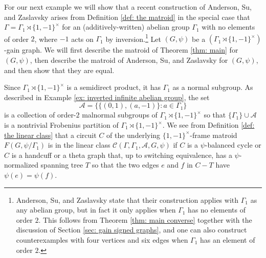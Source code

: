 \documentclass[12pt]{article}
\theoremstyle{definition}
\newcommand{\cA}{\mathcal{A}}
\newcommand{\cC}{\mathcal{C}}
\begin{document}
For our next example we will show that a recent construction of Anderson, Su, and Zaslavsky \cite{Anderson-Su-Zaslavsky2024} arises from Definition \ref{def: the matroid} in the special case that $\Gamma = \Gamma_1 \rtimes \{1,-1\}^{\times}$ for an (additively-written) abelian group $\Gamma_1$ with no elements of order $2$, where $-1$ acts on $\Gamma_1$ by inversion.\footnote{Anderson, Su, and Zaslavsky state that their construction applies with $\Gamma_1$ as any abelian group, but in fact it only applies when $\Gamma_1$ has no elements of order $2$. This follows from Theorem \ref{thm: main converse} together with the discussion of Section \ref{sec: gain signed graphs}, and one can also construct counterexamples with four vertices and six edges when $\Gamma_1$ has an element of order $2$.}
Let $(G, \psi)$ be a $(\Gamma_1 \rtimes \{1,-1\}^{\times})$-gain graph.
We will first describe the matroid of Theorem \ref{thm: main} for $(G, \psi)$, then describe the matroid of Anderson, Su, and Zaslavsky for $(G, \psi)$, and then show that they are equal.


Since $\Gamma_1 \rtimes \{1,-1\}^{\times}$ is a semidirect product, it has $\Gamma_1$ as a normal subgroup.
As described in Example \ref{ex: inverted infinite abelian group}, the set 
$$\cA = \big\{\{(0,1), (a,-1)\} \colon a \in \Gamma_1\big\}$$
is a collection of order-$2$ malnormal subgroups of $\Gamma_1 \rtimes \{1,-1\}^{\times}$ so that $\{\Gamma_1\} \cup \cA$ is a nontrivial Frobenius partition of $\Gamma_1 \rtimes \{1,-1\}^{\times}$.
We see from Definition \ref{def: the linear class} that a circuit $C$ of the underlying $\{1,-1\}^{\times}$-frame matroid $F(G, \psi/\Gamma_1)$ is in the linear class $\cC(\Gamma, \Gamma_1, \cA, G, \psi)$ if $C$ is a $\psi$-balanced cycle or $C$ is a handcuff or a theta graph that, up to switching equivalence, has a $\psi$-normalized spanning tree $T$ so that the two edges $e$ and $f$ in $C - T$ have $\psi(e) = \psi(f)$.
\end{document}
